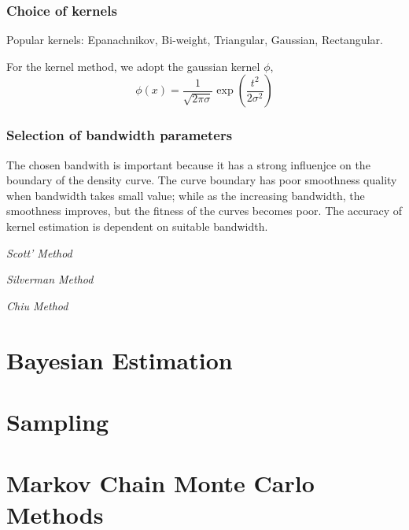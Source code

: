 \subsubsection{Choice of kernels}
Popular kernels: Epanachnikov, Bi-weight, Triangular, Gaussian, Rectangular.

For the kernel method, we adopt the gaussian kernel $\phi$,
\begin{equation}
  \phi(x)=\frac{1}{\sqrt{2\pi\sigma}}\exp{\left(\frac{t^2}{2\sigma^2}\right)}
\end{equation}
\subsubsection{Selection of bandwidth parameters}
The chosen bandwith is important because it has a strong influenjce on the boundary of the density curve.  The curve boundary has poor smoothness quality when bandwidth takes small value; while as the increasing bandwidth, the smoothness improves, but the fitness of the curves becomes poor.  The accuracy of kernel estimation is dependent on suitable bandwidth.

\emph{Scott' Method}

\emph{Silverman Method}

\emph{Chiu Method}
\section{Bayesian Estimation}

\section{Sampling}

\section{Markov Chain Monte Carlo Methods}
